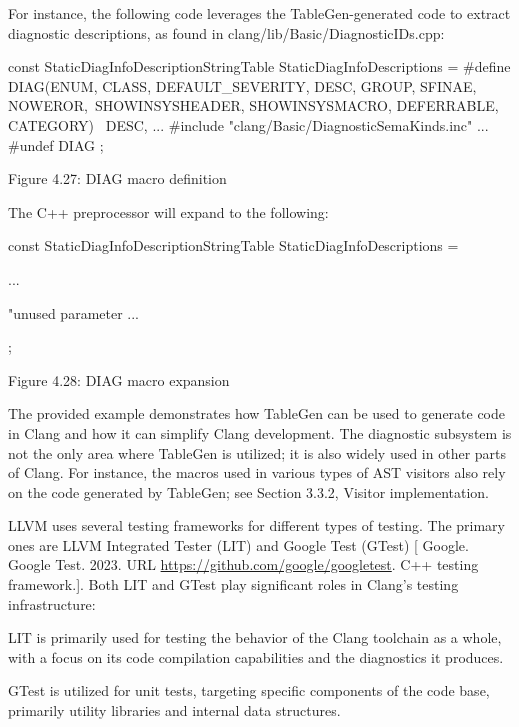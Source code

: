 For instance, the following code leverages the TableGen-generated code to extract diagnostic descriptions, as found in clang/lib/Basic/DiagnosticIDs.cpp:

\begin{cpp}
const StaticDiagInfoDescriptionStringTable StaticDiagInfoDescriptions = {
  #define DIAG(ENUM, CLASS, DEFAULT_SEVERITY, DESC, GROUP, SFINAE, NOWEROR,\
    SHOWINSYSHEADER, SHOWINSYSMACRO, DEFERRABLE, CATEGORY)    \
    DESC,
    ...
    #include "clang/Basic/DiagnosticSemaKinds.inc"
    ...
    #undef DIAG
};
\end{cpp}

\begin{center}
Figure 4.27: DIAG macro definition
\end{center}

The C++ preprocessor will expand to the following:

\begin{cpp}
const StaticDiagInfoDescriptionStringTable StaticDiagInfoDescriptions = {
    ...

    "unused parameter %
    ...
};
\end{cpp}

\begin{center}
Figure 4.28: DIAG macro expansion
\end{center}

The provided example demonstrates how TableGen can be used to generate code in Clang and how it can simplify Clang development. The diagnostic subsystem is not the only area where TableGen is utilized; it is also widely used in other parts of Clang. For instance, the macros used in various types of AST visitors also rely on the code generated by TableGen; see Section 3.3.2, Visitor implementation.

\mySubsubsection{4.5.2.}{LLVM test framework}

LLVM uses several testing frameworks for different types of testing. The primary ones are LLVM Integrated Tester (LIT) and Google Test (GTest) [ Google. Google Test. 2023. URL \url{https://github.com/google/googletest}. C++ testing framework.]. Both LIT and GTest play significant roles in Clang’s testing infrastructure:

LIT is primarily used for testing the behavior of the Clang toolchain as a whole, with a focus on its code compilation capabilities and the diagnostics it produces.

GTest is utilized for unit tests, targeting specific components of the code base, primarily utility libraries and internal data structures.

